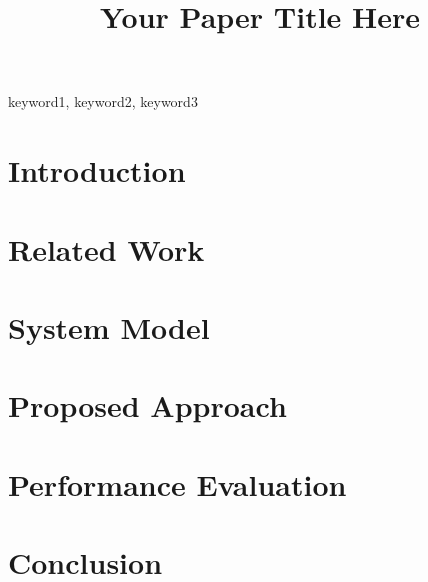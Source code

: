 \documentclass[conference]{IEEEtran}
\begin{document}
\title{Your Paper Title Here}

\author{
  \and
}

\maketitle

\begin{abstract}
  
\end{abstract}

\begin{IEEEkeywords}
keyword1, keyword2, keyword3
\end{IEEEkeywords}


\section{Introduction}
\label{sec:intro}


\section{Related Work}
\label{sec:related}


\section{System Model}
\label{sec:model}


\section{Proposed Approach}
\label{sec:method}


\section{Performance Evaluation}
\label{sec:eval}


\section{Conclusion}
\label{sec:conclusion}





\end{document}

